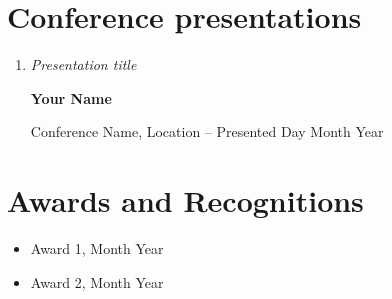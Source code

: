 \section*{Conference presentations}
\begin{enumerate}
    \item \textit{Presentation title}
    
    \textbf{Your Name}
    
    Conference Name, Location – Presented Day Month Year

\end{enumerate}

\section*{Awards and Recognitions}
\begin{itemize}
    \item Award 1, Month Year

    \item Award 2, Month Year

\end{itemize}